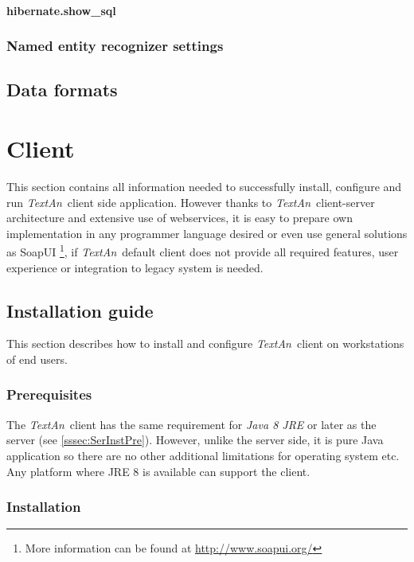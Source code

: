 \documentclass[12pt,a4paper]{report}
\newcommand{\textan}{\emph{TextAn}}
\begin{document}
\paragraph{hibernate.show\_sql}

\subsubsection{Named entity recognizer settings}

\subsection{Data formats}

\section{Client}

This section contains all information needed to successfully install, configure and run \textan\ client side application.
However thanks to \textan\ client-server architecture and extensive use of webservices,
it is easy to prepare own implementation in any programmer language desired or even use general solutions as SoapUI
\footnote{More information can be found at \url{http://www.soapui.org/}},
if \textan\ default client does not provide all required features, user experience or integration to legacy system is needed.

\subsection{Installation guide}

This section describes how to install and configure \textan\ client on workstations of end users.

\subsubsection{Prerequisites}

The \textan\ client has the same requirement for \emph{Java 8 JRE} or later as the server (see \ref{sssec:SerInstPre}).
However, unlike the server side, it is pure Java application so there are no other additional limitations for operating system etc.
Any platform where JRE 8 is available can support the client.

\subsubsection{Installation}
\end{document}
